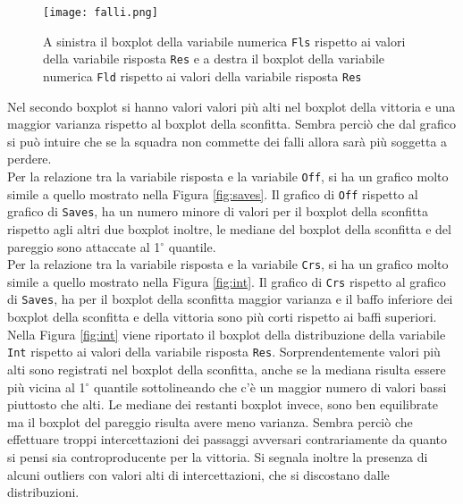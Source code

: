 \begin{figure}[htbp]
	\begin{center}
		\texttt{[image: falli.png]}
		\caption{A sinistra il boxplot della variabile numerica \texttt{Fls} rispetto ai valori della variabile risposta \texttt{Res} e a destra il boxplot della variabile numerica \texttt{Fld} rispetto ai valori della variabile risposta \texttt{Res}} \label{fig:falli}
	\end{center}
\end{figure}

Nel secondo boxplot si hanno valori valori più alti nel boxplot della vittoria e una maggior varianza rispetto al boxplot della sconfitta. Sembra perciò che dal grafico si può intuire che se la squadra non commette dei falli allora sarà più soggetta a perdere.\\

Per la relazione tra la variabile risposta e la variabile \texttt{Off}, si ha un grafico molto simile a quello mostrato nella Figura \ref{fig:saves}. Il grafico di \texttt{Off} rispetto al grafico di \texttt{Saves}, ha un numero minore di valori per il boxplot della sconfitta rispetto agli altri due boxplot inoltre, le mediane del boxplot della sconfitta e del pareggio sono attaccate al 1$^{\circ}$ quantile.\\

Per la relazione tra la variabile risposta e la variabile \texttt{Crs}, si ha un grafico molto simile a quello mostrato nella Figura \ref{fig:int}. Il grafico di \texttt{Crs} rispetto al grafico di \texttt{Saves}, ha per il boxplot della sconfitta maggior varianza e il baffo inferiore dei boxplot della sconfitta e della vittoria sono più corti rispetto ai baffi superiori.\\

Nella Figura \ref{fig:int} viene riportato il boxplot della distribuzione della variabile \texttt{Int} rispetto ai valori della variabile risposta \texttt{Res}. Sorprendentemente valori più alti sono registrati nel boxplot della sconfitta, anche se la mediana risulta essere più vicina al 1$^{\circ}$ quantile sottolineando che c'è un maggior numero di valori bassi piuttosto che alti. Le mediane dei restanti boxplot invece, sono ben equilibrate ma il boxplot del pareggio risulta avere meno varianza. Sembra perciò che effettuare troppi intercettazioni dei passaggi avversari contrariamente da quanto si pensi sia controproducente per la vittoria. Si segnala inoltre la presenza di alcuni outliers con valori alti di intercettazioni, che si discostano dalle distribuzioni.\\

